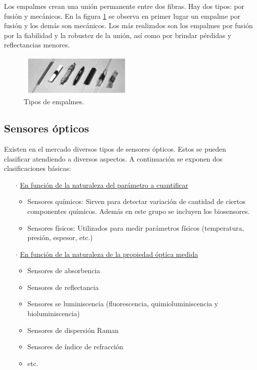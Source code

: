\begin{itemize}
 		Los empalmes crean una unión permanente entre dos fibras. Hay dos tipos: por fusión y mecánicos. En la figura \ref{fig:empalmeTipo} se observa en primer lugar un empalme por fusión y los demás son mecánicos. Los más realizados son los empalmes por fusión por la fiabilidad y la robustez de la unión, así como por brindar pérdidas y reflectancias menores.
 		
 		\begin{figure}[H]
 			\centering
 			\includegraphics[width=0.5\textwidth]{./img/tiposEmpalme}
 			\caption{Tipos de empalmes. \cite{FOAconect}} 
 			\label{fig:empalmeTipo}
 		\end{figure} 
 	
		
 

 	 \end{itemize}					

\subsection{Sensores ópticos} %
\label{sec:sensores3}

		
		Existen en el mercado diversos tipos de sensores ópticos. Estos se pueden clasificar atendiendo a diversos aspectos. A continuación se exponen dos clasificaciones básicas\cite{sensoresOpticos}: 

			\begin{itemize}
				\item[$\cdot$] \underline{En función de la naturaleza del parámetro a cuantificar}
				\begin{itemize}
					\item Sensores químicos: Sirven para detectar variación de cantidad de ciertos componentes químicos. Además en este grupo se incluyen los biosensores.
					\item Sensores físicos: Utilizados para medir parámetros físicos (temperatura, presión, espesor, etc.)
				\end{itemize}
				\item[$\cdot$] \underline{En función de la naturaleza de la propiedad óptica medida}
				\begin{itemize}
					\item Sensores de absorbencia
					\item Sensores de reflectancia
					\item Sensores se luminiscencia (fluorescencia, quimioluminiscencia y bioluminiscencia)
					\item Sensores de dispersión Raman
					\item Sensores de índice de refracción
					\item etc.
				\end{itemize}
				\end{itemize}
			
